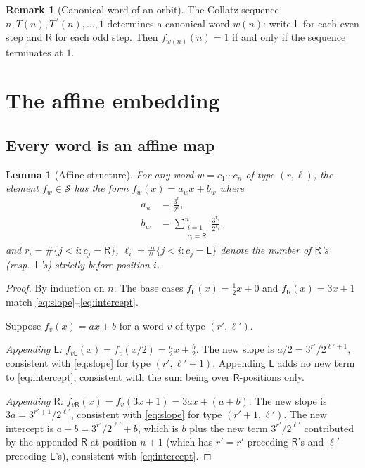 \documentclass[12pt, a4paper]{amsart}
\theoremstyle{plain}
\newtheorem{lemma}[theorem]{Lemma}
\theoremstyle{definition}
\newtheorem{remark}[theorem]{Remark}
\theoremstyle{remark}
\newcommand{\wL}{\mathsf{L}}
\newcommand{\wR}{\mathsf{R}}
\begin{document}
\begin{remark}[Canonical word of an orbit]
  \label{rem:canonical}
  The Collatz sequence $n, T(n), T^2(n), \ldots, 1$ determines a
  canonical word $w(n)$: write $\wL$ for each even step and $\wR$ for
  each odd step.  Then $f_{w(n)}(n)=1$ if and only if the sequence
  terminates at $1$.
\end{remark}

\section{The affine embedding}
\label{sec:embedding}

\subsection{Every word is an affine map}

\begin{lemma}[Affine structure]
  \label{lem:affine}
  For any word $w = c_1\cdots c_n$ of type $(r,\ell)$, the element
  $f_w\in\mathcal{S}$ has the form $f_w(x) = a_w x + b_w$ where
  \begin{align}
    a_w &= \frac{3^r}{2^\ell}, \label{eq:slope} \\
    b_w &= \sum_{\substack{i=1\\c_i=\wR}}^{n}
           \frac{3^{r_i}}{2^{\ell_i}}, \label{eq:intercept}
  \end{align}
  and $r_i = \#\{j < i : c_j = \wR\}$,
  $\ell_i = \#\{j < i : c_j = \wL\}$ denote the number of $\wR$'s
  (resp.\ $\wL$'s) strictly before position $i$.
\end{lemma}

\begin{proof}
  By induction on $n$.  The base cases
  $f_\wL(x)=\frac{1}{2}x+0$ and $f_\wR(x)=3x+1$ match
  \eqref{eq:slope}--\eqref{eq:intercept}.

  Suppose $f_v(x) = ax+b$ for a word $v$ of type $(r',\ell')$.

  \noindent\emph{Appending $\wL$:}
  $f_{v\wL}(x) = f_v(x/2) = \frac{a}{2}x + \frac{b}{2}$.
  The new slope is $a/2 = 3^{r'}/2^{\ell'+1}$, consistent with
  \eqref{eq:slope} for type $(r',\ell'+1)$.  Appending $\wL$ adds no
  new term to \eqref{eq:intercept}, consistent with the sum being over
  $\wR$-positions only.

  \noindent\emph{Appending $\wR$:}
  $f_{v\wR}(x) = f_v(3x+1) = 3ax + (a+b)$.
  The new slope is $3a = 3^{r'+1}/2^{\ell'}$, consistent with
  \eqref{eq:slope} for type $(r'+1,\ell')$.  The new intercept is
  $a+b = 3^{r'}/2^{\ell'} + b$, which is $b$ plus the new term
  $3^{r'}/2^{\ell'}$ contributed by the appended $\wR$ at position
  $n+1$ (which has $r' = r'$ preceding $\wR$'s and $\ell'$ preceding
  $\wL$'s), consistent with \eqref{eq:intercept}.
\end{proof}
\end{document}

